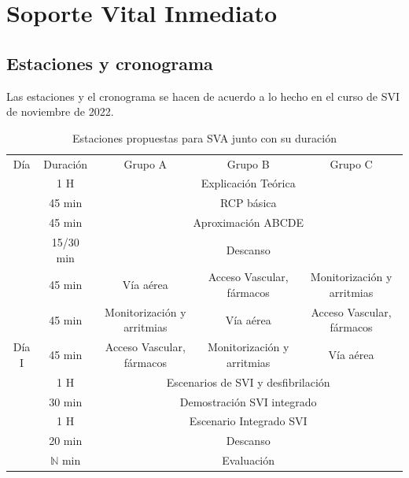 \section{Soporte Vital Inmediato}
\subsection{Estaciones y cronograma}
Las estaciones y el cronograma se hacen de acuerdo a lo hecho en el curso de SVI de noviembre de 2022. 

\begin{table}[hptb]
    \centering
    \begin{tabular}{ccccc}
    \rowcolor[HTML]{333333} 
    {\color[HTML]{FFFFFF} Día} & {\color[HTML]{FFFFFF} Duración} & {\color[HTML]{FFFFFF} Grupo A} & {\color[HTML]{FFFFFF} Grupo B} & {\color[HTML]{FFFFFF} Grupo C} \\
     & 1 H & \multicolumn{3}{c}{Explicación Teórica} \\
     & \cellcolor[HTML]{D9D9D9}45 min & \multicolumn{3}{c}{\cellcolor[HTML]{D9D9D9}RCP básica} \\
     & 45 min & \multicolumn{3}{c}{Aproximación ABCDE} \\
     & \cellcolor[HTML]{D9D9D9}15/30 min & \multicolumn{3}{c}{\cellcolor[HTML]{D9D9D9}Descanso} \\
     & 45 min & Vía aérea & Acceso Vascular, fármacos & Monitorización y arritmias \\
     & \cellcolor[HTML]{D9D9D9}45 min & \cellcolor[HTML]{D9D9D9}Monitorización y arritmias & \cellcolor[HTML]{D9D9D9}Vía aérea & \cellcolor[HTML]{D9D9D9}Acceso Vascular,  fármacos \\
    \multirow{-7}{*}{Día I} & 45 min & Acceso Vascular, fármacos & Monitorización y arritmias & Vía aérea \\ \hline
    \rowcolor[HTML]{D9D9D9} 
    \cellcolor[HTML]{D9D9D9} & 1 H & \multicolumn{3}{c}{\cellcolor[HTML]{D9D9D9}Escenarios de SVI y desfibrilación} \\
    \cellcolor[HTML]{D9D9D9} & 30 min & \multicolumn{3}{c}{Demostración SVI integrado} \\
    \rowcolor[HTML]{D9D9D9} 
    \cellcolor[HTML]{D9D9D9} & 1 H & \multicolumn{3}{c}{\cellcolor[HTML]{D9D9D9}Escenario Integrado SVI} \\
    \cellcolor[HTML]{D9D9D9} & 20 min & \multicolumn{3}{c}{Descanso} \\
    \rowcolor[HTML]{D9D9D9} 
    \multirow{-5}{*}{\cellcolor[HTML]{D9D9D9}Día II} & $\mathbb{N}$ min & \multicolumn{3}{c}{\cellcolor[HTML]{D9D9D9}Evaluación} \\ \hline
    \end{tabular}
    \caption{Estaciones propuestas para SVA junto con su duración}
    \label{tab:Brusilov:SVI:Estaciones}
\end{table}

